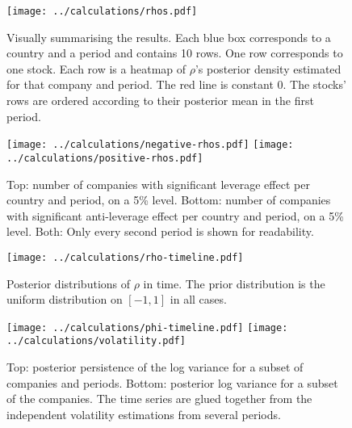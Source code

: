\begin{figure}[p]
	\vspace*{-3.2cm}
	\centering
	\texttt{[image: ../calculations/rhos.pdf]}
	\caption[Visually summarising the results]{Visually summarising the results. Each blue box corresponds to a country and a period and contains 10 rows. One row corresponds to one stock. Each row is a heatmap of $\rho$'s posterior density estimated for that company and period. The red line is constant 0. The stocks' rows are ordered according to their posterior mean in the first period.}
	\label{fig:rhos}
\end{figure}

\begin{figure}[p]
	\vspace*{-3.2cm}
	\centering
	\texttt{[image: ../calculations/negative-rhos.pdf]}
	\texttt{[image: ../calculations/positive-rhos.pdf]}
	\caption[Significant leverage effect]{Top: number of companies with significant leverage effect per country and period, on a 5\% level. Bottom: number of companies with significant anti-leverage effect per country and period, on a 5\% level. Both: Only every second period is shown for readability.}
	\label{fig:negative-rhos}
\end{figure}

\begin{figure}[p]
	\vspace*{-3.2cm}
	\centering
	\texttt{[image: ../calculations/rho-timeline.pdf]}
	\caption[Timeline of posterior $\rho$]{Posterior distributions of $\rho$ in time. The prior distribution is the uniform distribution on $[-1,1]$ in all cases.}
	\label{fig:company-rhos}
\end{figure}

\begin{figure}[p]
	\vspace*{-3.2cm}
	\centering
	\texttt{[image: ../calculations/phi-timeline.pdf]}
	\texttt{[image: ../calculations/volatility.pdf]}
	\caption[Timeline of persistence and volatility]{Top: posterior persistence of the log variance for a subset of companies and periods. Bottom: posterior log variance for a subset of the companies. The time series are glued together from the independent volatility estimations from several periods.}
	\label{fig:persistence}
\end{figure}
